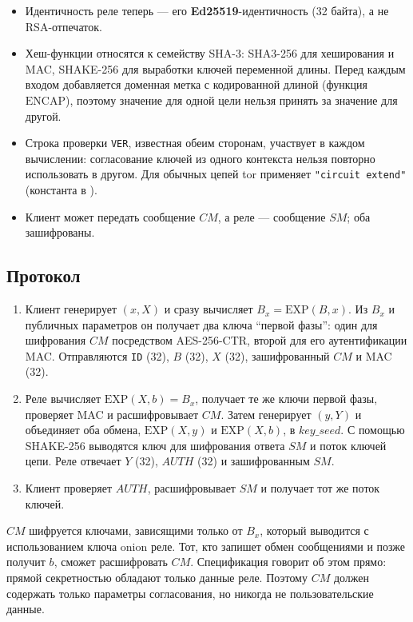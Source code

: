 \begin{itemize}
  \item Идентичность реле теперь --- его \textbf{Ed25519}-идентичность (32 байта), а не RSA-отпечаток.
  \item Хеш-функции относятся к семейству SHA-3: SHA3-256 для хеширования и MAC, SHAKE-256 для выработки ключей переменной длины. Перед каждым входом добавляется доменная метка с кодированной длиной (функция $\mathrm{ENCAP}$), поэтому значение для одной цели нельзя принять за значение для другой.
  \item Строка проверки \texttt{VER}, известная обеим сторонам, участвует в каждом вычислении: согласование ключей из одного контекста нельзя повторно использовать в другом. Для обычных цепей tor применяет \texttt{"circuit extend"} (константа  в ).
  \item Клиент может передать сообщение $CM$, а реле --- сообщение $SM$; оба зашифрованы.
\end{itemize}

\subsection{Протокол}

\begin{enumerate}
  \item Клиент генерирует $(x, X)$ и сразу вычисляет $B_x = \mathrm{EXP}(B, x)$. Из $B_x$ и публичных параметров он получает два ключа \enquote{первой фазы}: один для шифрования $CM$ посредством AES-256-CTR, второй для его аутентификации MAC. Отправляются \texttt{ID} (32), $B$ (32), $X$ (32), зашифрованный $CM$ и MAC (32).
  \item Реле вычисляет $\mathrm{EXP}(X, b) = B_x$, получает те же ключи первой фазы, проверяет MAC и расшифровывает $CM$. Затем генерирует $(y, Y)$ и объединяет оба обмена, $\mathrm{EXP}(X, y)$ и $\mathrm{EXP}(X, b)$, в $\mathit{key\_seed}$. С помощью SHAKE-256 выводятся ключ для шифрования ответа $SM$ и поток ключей цепи. Реле отвечает $Y$ (32), $\mathit{AUTH}$ (32) и зашифрованным $SM$.
  \item Клиент проверяет $\mathit{AUTH}$, расшифровывает $SM$ и получает тот же поток ключей.
\end{enumerate}

\begin{attenzione}
$CM$ шифруется ключами, зависящими только от $B_x$, который выводится с использованием ключа onion реле. Тот, кто запишет обмен сообщениями и позже получит $b$, сможет расшифровать $CM$. Спецификация говорит об этом прямо: прямой секретностью обладают только данные реле. Поэтому $CM$ должен содержать только параметры согласования, но никогда не пользовательские данные.
\end{attenzione}

